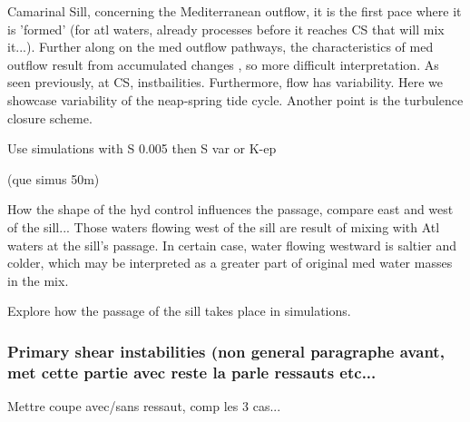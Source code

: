 Camarinal Sill, concerning the Mediterranean outflow, it is the first pace where it is 'formed' (for atl waters, already processes before it reaches CS that will mix it...). Further along on the med outflow pathways, the characteristics of med outflow result from accumulated changes , so more difficult interpretation.  As seen previously, at CS, instbailities. Furthermore, flow has variability. Here we showcase variability of the neap-spring tide cycle. Another point is the turbulence closure scheme.

Use simulations with S 0.005 then S var or K-ep

(que simus 50m)



How the shape of the hyd control influences the passage, compare east and west of the sill... 
Those waters flowing west of the sill are result of mixing with Atl waters at the sill's passage.
In certain case, water flowing westward is saltier and colder, which may be interpreted as a greater part of original med water masses in the mix.


Explore how the passage of the sill takes place in simulations.



\subsubsection{Primary shear instabilities  (non general paragraphe avant, met cette partie avec reste la parle ressauts etc...}

Mettre coupe avec/sans ressaut, comp les 3 cas...


